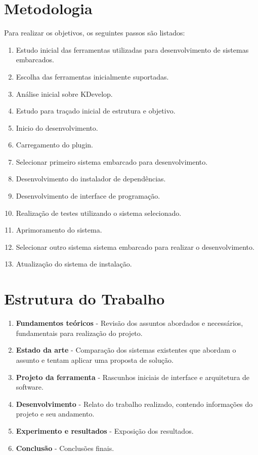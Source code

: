 \section{Metodologia}
\label{ss:objetivosespecificos}
Para realizar os objetivos, os seguintes passos são listados:
\begin{enumerate}
\item Estudo inicial das ferramentas utilizadas para desenvolvimento de sistemas embarcados.
\item Escolha das ferramentas inicialmente suportadas.
\item Análise inicial sobre KDevelop.
\item Estudo para traçado inicial de estrutura e objetivo.
\item Inicio do desenvolvimento.
\item Carregamento do plugin.
\item Selecionar primeiro sistema embarcado para desenvolvimento.
\item Desenvolvimento do instalador de dependências.
\item Desenvolvimento de interface de programação.
\item Realização de testes utilizando o sistema selecionado.
\item Aprimoramento do sistema.
\item Selecionar outro sistema sistema embarcado para realizar o desenvolvimento.
\item Atualização do sistema de instalação.
\end{enumerate}

\section{Estrutura do Trabalho}

\begin{enumerate}
\item \textbf{Fundamentos teóricos} - Revisão dos assuntos abordados e necessários, fundamentais para realização do projeto.
\item \textbf{Estado da arte} - Comparação dos sistemas existentes que abordam o assunto e tentam aplicar uma proposta de solução.
\item \textbf{Projeto da ferramenta} - Rascunhos iniciais de interface e arquitetura de software.
\item \textbf{Desenvolvimento} - Relato do trabalho realizado, contendo informações do projeto e seu andamento.
\item \textbf{Experimento e resultados} - Exposição dos resultados.
\item \textbf{Conclusão} - Conclusões finais.
\end{enumerate}
